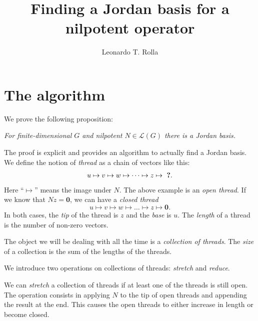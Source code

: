 \documentclass[12pt]{article}
\newcommand{\1}{\mathbf{1}}
\newcommand{\0}{\mathbf{0}}
\newcommand{\cL}{\mathcal{L}}
\theoremstyle{definition}
\begin{document}
\title{Finding a Jordan basis for a nilpotent operator}
\author{Leonardo T. Rolla}
\maketitle

{\let\thefootnote\relax
{}}

\section{The algorithm}

We prove the following proposition:

\begin{center}
\emph{For finite-dimensional $G$ and nilpotent $ N\in\cL(G) $ there is a Jordan basis.}
\end{center}


The proof is explicit and provides an algorithm to actually find a Jordan basis.
We define the notion of \emph{thread} as a chain of vectors like this:
\[
u \mapsto v \mapsto w \mapsto \dots \mapsto z
\mapsto
\text{ \bf ?}
.
\]
Here ``$ \mapsto $'' means the image under $N$.
The above example is an \emph{open thread}.
If we know that $Nz=\0$, we can have a \emph{closed thread}
\[
u \mapsto v \mapsto w \mapsto \dots \mapsto z
\mapsto
\0
.
\]
In both cases, the \emph{tip} of the thread is $z$ and the \emph{base} is $u$.
	The \emph{length} of a thread is the number of non-zero vectors.

The object we will be dealing with all the time is a \emph{collection of threads}.
The \emph{size} of a collection is the sum of the lengths of the threads.

We introduce two operations on collections of threads: \emph{stretch} and \emph{reduce}.

We can \emph{stretch} a collection of threads if at least one of the threads is still open. The operation consists in applying $N$ to the tip of open threads and appending the result at the end. This causes the open threads to either increase in length or become closed.
\end{document}
